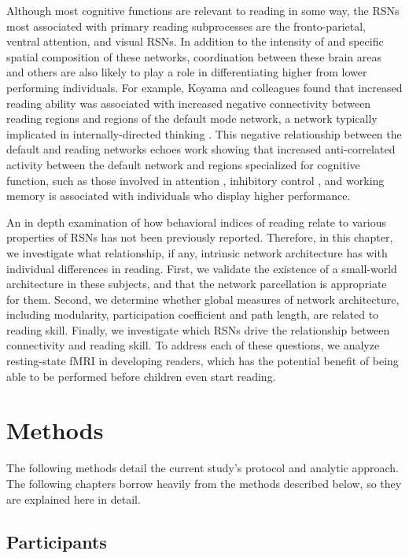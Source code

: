 \begin{itmeize}
Although most cognitive functions are relevant to reading in some way, the RSNs most associated with primary reading subprocesses are the fronto-parietal, ventral attention, and visual RSNs.  In addition to the intensity of and specific spatial composition of these networks, coordination between these brain areas and others are also likely to play a role in differentiating higher from lower performing individuals. For example, Koyama and colleagues found that increased reading ability was associated with increased negative connectivity between reading regions and regions of the default mode network, a network typically implicated in internally-directed thinking \citep{Andrews-Hanna2011}. This negative relationship between the default and reading networks echoes work showing that increased anti-correlated activity between the default network and regions specialized for cognitive function, such as those involved in attention \citep{Kelly2008, Mennes2010, Seeley2007}, inhibitory control \citep{Tian2013}, and working memory \citep{Keller2015, Sala-Llonch2011} is associated with individuals who display higher performance. 

An in depth examination of how behavioral indices of reading relate to various properties of RSNs has not been previously reported. Therefore, in this chapter, we investigate what relationship, if any, intrinsic network architecture has with individual differences in reading. First, we validate the existence of a small-world architecture in these subjects, and that the network parcellation is appropriate for them. Second, we determine whether global measures of network architecture, including modularity, participation coefficient and path length, are related to reading skill. Finally, we investigate which RSNs drive the relationship between connectivity and reading skill. To address each of these questions, we analyze resting-state fMRI in developing readers, which has the potential benefit of being able to be performed before children even start reading.


\section{Methods}

The following methods detail the current study's protocol and analytic approach. The following chapters borrow heavily from the methods described below, so they are explained here in detail. 

\subsection{Participants}


\end{itmeize}

